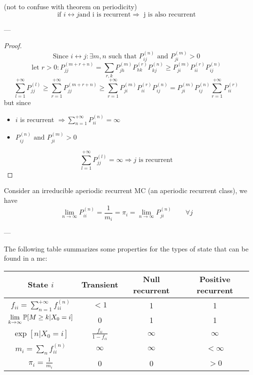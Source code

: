 	\begin{theorem}
		(not to confuse with theorem on periodicity)
		$$\text{if } i\leftrightarrow j \text{and i is recurrent} \Rightarrow \text{ j is also recurrent}$$
	\end{theorem}
	---
	\begin{proof}
		$$\text{Since } i\leftrightarrow j : \exists m,n \text{ such that } P_{ij}^{(n)} \text{ and } P_{ji}^{(m)} > 0$$
		$$\text{let } r>0 : P_{jj}^{(m+r+n)} = \sum\limits_{r, k} P_{jh}^{(m)} P_{hk}^{(r)} P_{kj}^{(n)} \geq P_{ji}^{(m)}  P_{ii}^{(r)}  P_{ij}^{(n)}$$
		$$\sum\limits_{l=1}^{+\infty} P_{jj}^{(l)} \geq \sum\limits_{r=1}^{+\infty} P_{jj}^{(m+r+n)} \geq \sum\limits_{r=1}^{+\infty} P_{ji}^{(m)}  P_{ii}^{(r)}  P_{ij}^{(n)} = P_{ji}^{(m)} P_{ij}^{(n)} \sum\limits_{r=1}^{+\infty} P_{ii}^{(r)}$$
		but since \begin{itemize}
		\item$i$ is recurrent $\Rightarrow \sum\limits_{n=1}^{+\infty} P_{ii}^{(n)} = \infty$
		\item $P_{ij}^{(n)} \text{ and } P_{ji}^{(m)} > 0$
		\end{itemize}
		$$\sum\limits_{l=1}^{+\infty} P_{jj}^{(l)} = \infty \Rightarrow j \text{ is recurrent}$$
  \end{proof}

	\begin{theorem} \label{th:basic_limit_MC}
		Consider an irreducible aperiodic recurrent MC (an aperiodic recurrent class), we have
		$$ \lim_{n\to \infty} P_{ii}^{(n)} = \frac{1}{m_i} = \pi_i = \lim_{n\to\infty} P_{ji}^{(n)} \qquad \forall j$$
	\end{theorem}
	---

	The following table summarizes some properties for the types of state that can be found in a \gls{mc}:

	{\renewcommand{\arraystretch}{1.2}
	\begin{center}
		\begin{tabular}{|c||c|c|c|}
			\hline
			State $i$ & Transient & Null recurrent & Positive recurrent \\ \hline
			$f_{ii} = \sum\limits_{n=1}^{+\infty} f_{ii}^{(n)}$ & $<1$ & 1 & 1 \\ \hline
			$\lim\limits_{k \to \infty } \mathbb{P}[M \geq k | X_0=i]$ & 0 & 1 & 1 \\ \hline
			$\exp[n|X_0=i]$ & $\frac{f_{ii}}{1-f_{ii}}$ & $\infty$ & $\infty$ \\ \hline
			$m_i = \sum\limits_n f_{ii}^{(n)}$ & $\infty$ & $\infty$ & $<\infty$ \\ \hline
			$\pi_i = \frac{1}{m_i}$ & 0 & 0 & $>0$ \\ \hline %
		\end{tabular}
	\end{center}}

